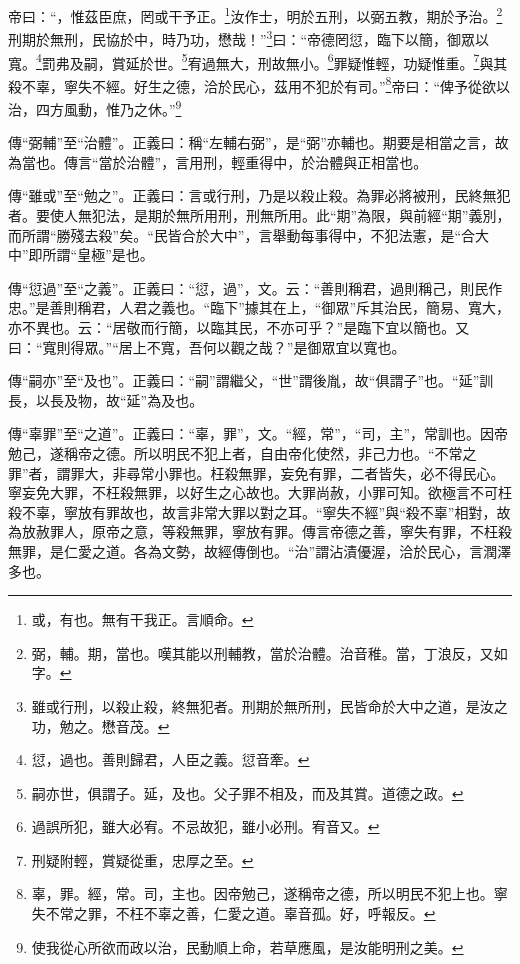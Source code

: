 帝曰：“，惟茲臣庶，罔或干予正。\footnote{或，有也。無有干我正。言順命。}汝作士，明於五刑，以弼五教，期於予治。\footnote{弼，輔。期，當也。嘆其能以刑輔教，當於治體。治音稚。當，丁浪反，又如字。}刑期於無刑，民協於中，時乃功，懋哉！”\footnote{雖或行刑，以殺止殺，終無犯者。刑期於無所刑，民皆命於大中之道，是汝之功，勉之。懋音茂。}曰：“帝德罔愆，臨下以簡，御眾以寬。\footnote{愆，過也。善則歸君，人臣之義。愆音牽。}罰弗及嗣，賞延於世。\footnote{嗣亦世，俱謂子。延，及也。父子罪不相及，而及其賞。道德之政。}宥過無大，刑故無小。\footnote{過誤所犯，雖大必宥。不忌故犯，雖小必刑。宥音又。}罪疑惟輕，功疑惟重。\footnote{刑疑附輕，賞疑從重，忠厚之至。}與其殺不辜，寧失不經。好生之德，洽於民心，茲用不犯於有司。”\footnote{辜，罪。經，常。司，主也。因帝勉己，遂稱帝之德，所以明民不犯上也。寧失不常之罪，不枉不辜之善，仁愛之道。辜音孤。好，呼報反。}帝曰：“俾予從欲以治，四方風動，惟乃之休。”\footnote{使我從心所欲而政以治，民動順上命，若草應風，是汝能明刑之美。}

{\noindent\zhuan{}\fzbyks 傳“弼輔”至“治體”。正義曰：稱“左輔右弼”，是“弼”亦輔也。期要是相當之言，故為當也。傳言“當於治體”，言用刑，輕重得中，於治體與正相當也。 \par}

{\noindent\zhuan{}\fzbyks 傳“雖或”至“勉之”。正義曰：言或行刑，乃是以殺止殺。為罪必將被刑，民終無犯者。要使人無犯法，是期於無所用刑，刑無所用。此“期”為限，與前經“期”義別，而所謂“勝殘去殺”矣。“民皆合於大中”，言舉動每事得中，不犯法憲，是“合大中”即所謂“皇極”是也。 \par}

{\noindent\zhuan{}\fzbyks 傳“愆過”至“之義”。正義曰：“愆，過”，文。云：“善則稱君，過則稱己，則民作忠。”是善則稱君，人君之義也。“臨下”據其在上，“御眾”斥其治民，簡易、寬大，亦不異也。云：“居敬而行簡，以臨其民，不亦可乎？”是臨下宜以簡也。又曰：“寬則得眾。”“居上不寬，吾何以觀之哉？”是御眾宜以寬也。 \par}

{\noindent\zhuan{}\fzbyks 傳“嗣亦”至“及也”。正義曰：“嗣”謂繼父，“世”謂後胤，故“俱謂子”也。“延”訓長，以長及物，故“延”為及也。 \par}

{\noindent\zhuan{}\fzbyks 傳“辜罪”至“之道”。正義曰：“辜，罪”，文。“經，常”，“司，主”，常訓也。因帝勉己，遂稱帝之德。所以明民不犯上者，自由帝化使然，非己力也。“不常之罪”者，謂罪大，非尋常小罪也。枉殺無罪，妄免有罪，二者皆失，必不得民心。寧妄免大罪，不枉殺無罪，以好生之心故也。大罪尚赦，小罪可知。欲極言不可枉殺不辜，寧放有罪故也，故言非常大罪以對之耳。“寧失不經”與“殺不辜”相對，故為放赦罪人，原帝之意，等殺無罪，寧放有罪。傳言帝德之善，寧失有罪，不枉殺無罪，是仁愛之道。各為文勢，故經傳倒也。“治”謂沾漬優渥，洽於民心，言潤澤多也。 \par}

